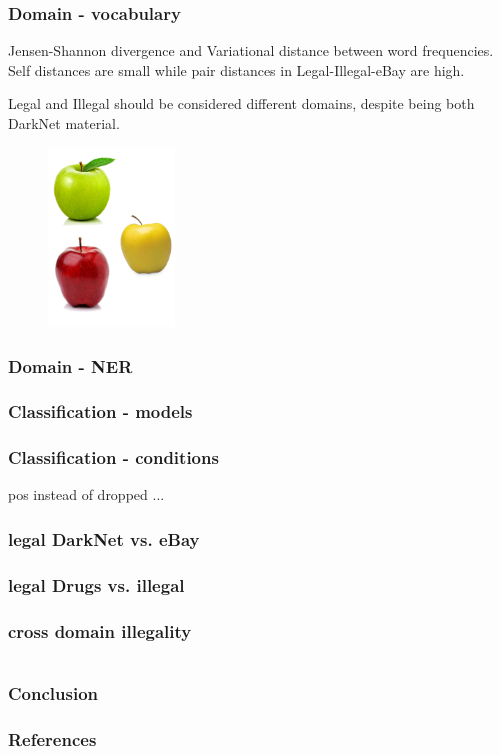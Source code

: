 \documentclass[t,xcolor={svgnames,table}]{beamer}
\begin{document}
\begin{frame}
	\frametitle{Domain - vocabulary}
	Jensen-Shannon divergence and Variational distance between word frequencies.
	Self distances are small while pair distances in Legal-Illegal-eBay are high.
	
	Legal and Illegal should be considered different domains, despite being both DarkNet material.
	\begin{figure}
		\centering
		\includegraphics[width=0.3\textwidth]{3different.png}
	\end{figure}

\end{frame}

\begin{frame}
	\frametitle{Domain - NER}
\end{frame}

\begin{frame}
	\frametitle{Classification - models}
\end{frame}
\begin{frame}
	\frametitle{Classification - conditions}
	pos instead of
	dropped 
	...
\end{frame}

\begin{frame}
	\frametitle{legal DarkNet vs. eBay}
\end{frame}
\begin{frame}
	\frametitle{legal Drugs vs. illegal}
\end{frame}
\begin{frame}
	\frametitle{cross domain illegality}
\end{frame}
\section*{}

\begin{frame}
\frametitle{Conclusion}
\end{frame}

\begin{frame}[allowframebreaks]
\frametitle{References}

\tiny
\end{frame}
\end{document}
